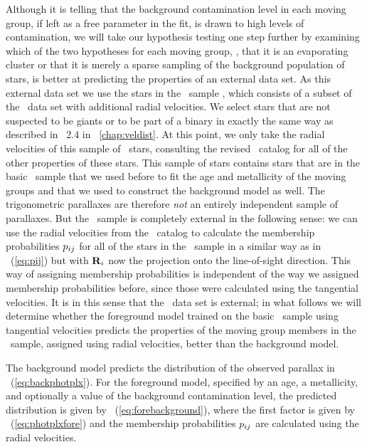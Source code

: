 Although it is telling that the background contamination level in each
moving group, if left as a free parameter in the fit, is drawn to high
levels of contamination, we will take our hypothesis testing one step
further by examining which of the two hypotheses for each moving
group, \ie, that it is an evaporating cluster or that it is merely a
sparse sampling of the background population of stars, is better at
predicting the properties of an external data set. As this external
data set we use the stars in the \gcsabb\ sample
\citep{2004A&A...418..989N}, which consists of a subset of the
\Hipparcos\ data set with additional radial velocities. We select
stars that are not suspected to be giants or to be part of a binary in
exactly the same way as described in \sectionname~2.4
in \chaptername~\ref{chap:veldist}. At this point, we only take the
radial velocities of this sample of
\ngcsstarsSSP\ stars, consulting the revised \Hipparcos\ catalog
\citep{2007ASSL..250.....V} for all of the other properties of these
stars. This sample of stars contains stars that are in the basic
\Hipparcos\ sample that we used before to fit the age and metallicity
of the moving groups and that we used to construct the background
model as well. The trigonometric parallaxes are therefore \emph{not}
an entirely independent sample of parallaxes. But the \gcsabb\ sample
is completely external in the following sense: we can use the radial
velocities from the \gcsabb\ catalog to calculate the membership
probabilities $p_{ij}$ for all of the stars in the \gcsabb\ sample in a
similar way as in \eqnname~(\ref{eq:pij}) but with $\mathbf{R}_i$ now the
projection onto the line-of-sight direction. This way of assigning
membership probabilities is independent of the way we assigned
membership probabilities before, since those were calculated using the
tangential velocities. It is in this sense that the \gcsabb\ data set
is external; in what follows we will determine whether the foreground
model trained on the basic \Hipparcos\ sample using tangential
velocities predicts the properties of the moving group members in the
\gcsabb\ sample, assigned using radial velocities, better than the
background model.

The background model predicts the distribution of the observed
parallax in \eqnname~(\ref{eq:backphotplx}). For the foreground model,
specified by an age, a metallicity, and optionally a value of the
background contamination level, the predicted distribution is given by
\eqnname~(\ref{eq:forebackground}), where the first factor is given by
\eqnname~(\ref{eq:photplxfore}) and the membership probabilities
$p_{ij}$ are calculated using the radial velocities.

